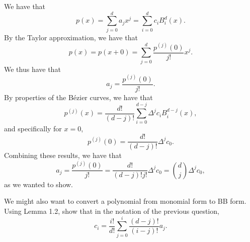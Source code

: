 \begin{solution}
    We have that
    \begin{equation*}
        p(x) = \sum_{j=0}^d a_j x^j = \sum_{i=0}^d c_i B_i^d(x).
    \end{equation*}
    By the Taylor approximation, we have that
    \begin{equation*}
        p(x) = p(x + 0) = \sum_{j=0}^d \frac{p^{(j)}(0)}{j!} x^j.
    \end{equation*}
    We thus have that
    \begin{equation*}
        a_j = \frac{p^{(j)}(0)}{j!}.
    \end{equation*}
    By properties of the Bézier curves, we have that
    \begin{equation*}
        p^{(j)}(x) = \frac{d!}{(d-j)!} \sum_{i = 0}^{d - j} \Delta^j c_i B_i^{d-j}(x),
    \end{equation*}
    and specifically for $x = 0$,
    \begin{equation*}
        p^{(j)}(0) = \frac{d!}{(d-j)!} \Delta^j c_0.
    \end{equation*}
    Combining these results, we have that
    \begin{equation*}
        a_j = \frac{p^{(j)}(0)}{j!} = \frac{d!}{(d-j)! j!} \Delta^j c_0 = \binom{d}{j} \Delta^j c_0,
    \end{equation*}
    as we wanted to show.
\end{solution}

\begin{exercise}
    We might also want to convert a polynomial from monomial form to BB form.
    Using Lemma 1.2, show that in the notation of the previous question,
    \begin{equation*}
        c_i = \frac{i!}{d!} \sum_{j=0}^i \frac{(d - j)!}{(i - j)!} a_j.
    \end{equation*}
\end{exercise}

